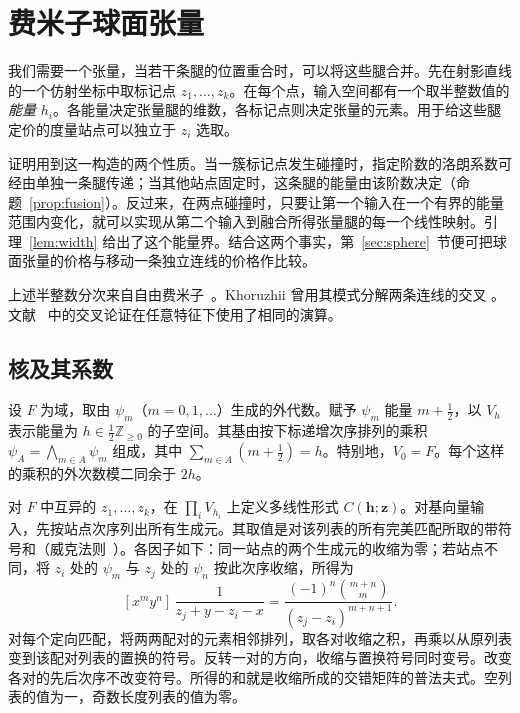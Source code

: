 \section{费米子球面张量}\label{sec:fermions}

我们需要一个张量，当若干条腿的位置重合时，可以将这些腿合并。先在射影直线的一个仿射坐标中取标记点 $z_1,\ldots,z_k$。在每个点，输入空间都有一个取半整数值的\emph{能量} $h_i$。各能量决定张量腿的维数，各标记点则决定张量的元素。用于给这些腿定价的度量站点可以独立于 $z_i$ 选取。

证明用到这一构造的两个性质。当一簇标记点发生碰撞时，指定阶数的洛朗系数可经由单独一条腿传递；当其他站点固定时，这条腿的能量由该阶数决定（命题~\ref{prop:fusion}）。反过来，在两点碰撞时，只要让第一个输入在一个有界的能量范围内变化，就可以实现从第二个输入到融合所得张量腿的每一个线性映射。引理~\ref{lem:width} 给出了这个能量界。结合这两个事实，第~\ref{sec:sphere}~节便可把球面张量的价格与移动一条独立连线的价格作比较。

上述半整数分次来自自由费米子~\cite[第~4~节]{kacwang}。Khoruzhii 曾用其模式分解两条连线的交叉 \cite{Khoruzhii}。文献~\cite[定理~]{oaG} 中的交叉论证在任意特征下使用了相同的演算。

\subsection{核及其系数}
设 $F$ 为域，取由 $\psi_m$（$m=0,1,\ldots$）生成的外代数。赋予 $\psi_m$ 能量 $m+\tfrac12$，以 $V_h$ 表示能量为 $h\in\frac12\mathbb Z_{\ge0}$ 的子空间。其基由按下标递增次序排列的乘积 $\psi_A=\bigwedge_{m\in A}\psi_m$ 组成，其中 $\sum_{m\in A}(m+\tfrac12)=h$。特别地，$V_0=F$。每个这样的乘积的外次数模二同余于 $2h$。

对 $F$ 中互异的 $z_1,\ldots,z_k$，在 $\prod_i V_{h_i}$ 上定义多线性形式 $C(\mathbf h;\mathbf z)$。对基向量输入，先按站点次序列出所有生成元。其取值是对该列表的所有完美匹配所取的带符号和（威克法则~\cite{wick}）。各因子如下：同一站点的两个生成元的收缩为零；若站点不同，将 $z_i$ 处的 $\psi_m$ 与 $z_j$ 处的 $\psi_n$ 按此次序收缩，所得为
\begin{equation}\label{eq:fermions-kernel}
 [x^m y^n]\,\frac{1}{z_j+y-z_i-x}
 =\frac{(-1)^n\binom{m+n}{m}}{(z_j-z_i)^{m+n+1}} .
\end{equation}
对每个定向匹配，将两两配对的元素相邻排列，取各对收缩之积，再乘以从原列表变到该配对列表的置换的符号。反转一对的方向，收缩与置换符号同时变号。改变各对的先后次序不改变符号。所得的和就是收缩所成的交错矩阵的普法夫式。空列表的值为一，奇数长度列表的值为零。

